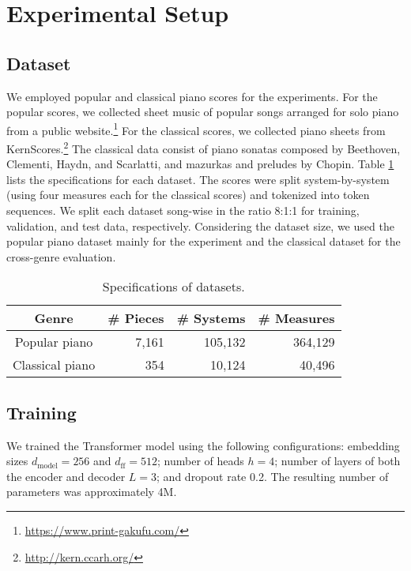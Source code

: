 \documentclass[sigconf]{acmart} %
\begin{document}
\section{Experimental Setup}
\subsection{Dataset}
We employed popular and classical piano scores for the experiments. For the popular scores, we collected sheet music of popular songs arranged for solo piano from a public website.\footnote{\url{https://www.print-gakufu.com/}}  For the classical scores, we collected piano sheets from KernScores.\footnote{\url{http://kern.ccarh.org/}} The classical data consist of piano sonatas composed by Beethoven, Clementi, Haydn, and Scarlatti, and mazurkas and preludes by Chopin. Table \ref{table:dataset} lists the specifications for each dataset. The scores were split system-by-system (using four measures each for the classical scores) and tokenized into token sequences. We split each dataset song-wise in the ratio 8:1:1 for training, validation, and test data, respectively. Considering the dataset size, we used the popular piano dataset mainly for the experiment and the classical dataset for the cross-genre evaluation.

\begin{table}[h]
 \caption{Specifications of datasets.}
 \label{table:dataset}
 \begin{tabular}{crrr} \toprule
 Genre & \# Pieces & \# Systems & \# Measures \\ \midrule
 Popular piano & 7,161 & 105,132 & 364,129 \\
 Classical piano & 354 & 10,124 & 40,496 \\ \bottomrule
 \end{tabular}
\end{table}

\subsection{Training}
We trained the Transformer model using the following configurations: embedding sizes $d_\mathrm{model} = 256$ and $d_\mathrm{ff} = 512$; number of heads $h = 4$; number of layers of both the encoder and decoder $L = 3$; and dropout rate 0.2. The resulting number of parameters was approximately 4M.
\end{document}
